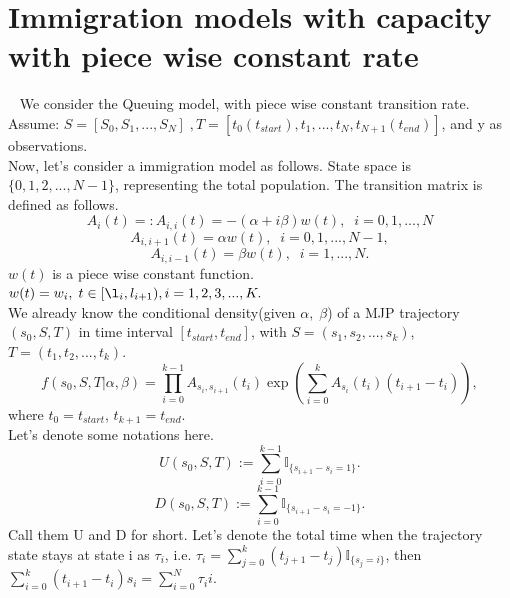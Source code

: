 \section{Immigration models with capacity with piece wise constant rate}~
We consider the Queuing model, with piece wise constant transition rate. 
\noindent Assume: $S = [S_0,S_1, ...,S_N] \;, T = [t_0(t_{start}), t_1,...,t_N, t_{N+1}(t_{end})]$, and y as observations.\\
Now, let's consider a immigration model as follows. State space is $\{0, 1, 2, ..., N - 1\}$, representing the total population. The transition matrix is defined as follows. 
$$A_i(t) =: A_{i,i}(t) = -(\alpha + i\beta)w(t), \; \; i =0,1,...,N$$ $$A_{i, i+1}(t) = \alpha w(t), \; \; i =0,1,...,N-1,$$ $$A_{i, i-1}(t)  = \beta w(t), \; \;  i =1,...,N.$$
$w(t)$ is a piece wise constant function. $w(t) = w_i, \; t \in [\l_i, l_{i + 1}), i = 1,2,3,..., K.$\\
We already know the conditional density(given $\alpha,\; \beta$) of a MJP trajectory $(s_0, S, T)$ in time interval $[t_{start}, t_{end}]$, with $S=(s_1, s_2,..., s_k)$, $T=(t_1, t_2,..., t_k)$. 
$$f(s_0,S,T| \alpha, \beta) = \prod_{i=0}^{k-1} A_{s_i, s_{i+1}}(t_i) \exp(\sum_{i=0}^{k} A_{s_i}(t_i)(t_{i+1} - t_{i})), $$
where $t_0 = t_{start}$, $t_{k+1} = t_{end}.$\\
Let's denote some notations here.\\
$$U(s_0, S, T):= \sum_{i=0}^{k-1} \mathbb{I}_{\{s_{i+1} - s_i = 1\}}.$$
$$D(s_0, S, T):= \sum_{i=0}^{k-1} \mathbb{I}_{\{s_{i+1} - s_i = -1\}}.$$
Call them U and D for short.
Let's denote the total time when the trajectory state stays at state i as $\tau_i$, i.e. $\tau_i = \sum_{j=0}^{k} (t_{j+1} -t_j)\mathbb{I}_{\{s_j = i\}}$, then $\sum_{i=0}^k (t_{i+1} - t_i)s_i = \sum_{i=0}^N \tau_ii.$\\

